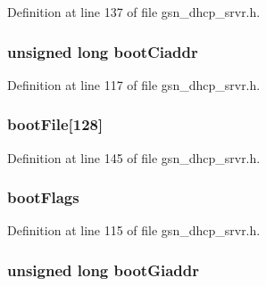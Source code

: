 Definition at line 137 of file gsn\_\-dhcp\_\-srvr.h.

\hypertarget{a00046_aab4e6c0f4dcf01263f1adf6f33e2ab6d}{
\subsubsection[{bootCiaddr}]{\setlength{\rightskip}{0pt plus 5cm}unsigned long {\bf bootCiaddr}}}
\label{a00046_aab4e6c0f4dcf01263f1adf6f33e2ab6d}


Definition at line 117 of file gsn\_\-dhcp\_\-srvr.h.

\hypertarget{a00046_ab799fcd688f0b9f083d02928b070469c}{
\subsubsection[{bootFile}]{ {\bf bootFile}\mbox{[}128\mbox{]}}}
\label{a00046_ab799fcd688f0b9f083d02928b070469c}


Definition at line 145 of file gsn\_\-dhcp\_\-srvr.h.

\hypertarget{a00046_a0612cc761a70188aafc3e33f50caee69}{
\subsubsection[{bootFlags}]{ {\bf bootFlags}}}
\label{a00046_a0612cc761a70188aafc3e33f50caee69}


Definition at line 115 of file gsn\_\-dhcp\_\-srvr.h.

\hypertarget{a00046_a3a95eb696914a23297c224d06d4e31e7}{
\subsubsection[{bootGiaddr}]{\setlength{\rightskip}{0pt plus 5cm}unsigned long {\bf bootGiaddr}}}
\label{a00046_a3a95eb696914a23297c224d06d4e31e7}


